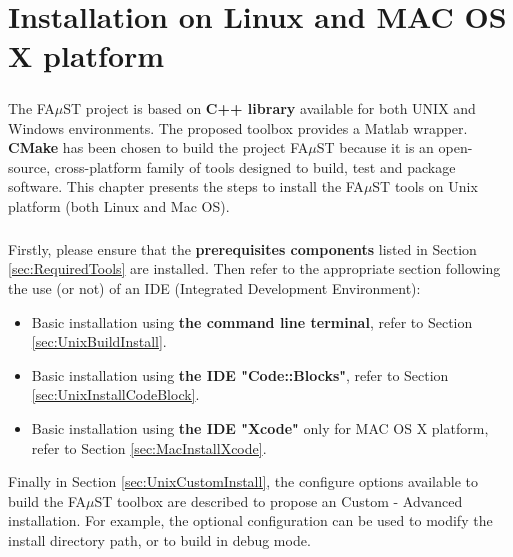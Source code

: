 \chapter{Installation on Linux and MAC OS X platform}\label{sec:InstallUnix}

\paragraph{}The FA$\mu$ST project is based on \textbf{C++ library} available for both UNIX and Windows environments. The proposed toolbox provides a Matlab wrapper. \textbf{CMake} has been chosen to build the project FA$\mu$ST because it is an open-source, cross-platform family of tools designed to build, test and package software. This chapter presents the steps to install the FA$\mu$ST tools on Unix platform (both Linux and Mac OS). 

\paragraph{}Firstly, please ensure that the \textbf{prerequisites components} listed in Section \ref{sec:RequiredTools} are installed. Then refer to the appropriate section following the use (or not) of an IDE (Integrated Development Environment): 
\begin{itemize}
\item Basic installation using \textbf{the command line terminal}, refer to Section \ref{sec:UnixBuildInstall}.
\item Basic installation using \textbf{the IDE "Code::Blocks"}, refer to Section \ref{sec:UnixInstallCodeBlock}. 
\item Basic installation using \textbf{the IDE "Xcode"} only for MAC OS X platform, refer to Section \ref{sec:MacInstallXcode}. 
\end{itemize}

Finally in Section \ref{sec:UnixCustomInstall}, the configure options available to build the FA$\mu$ST toolbox are described to propose an Custom - Advanced installation. For example, the optional configuration can be used to modify the install directory path, or to build in debug mode.  

